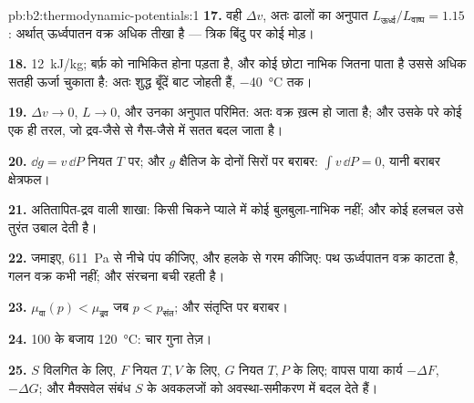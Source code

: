\begin{solution}{pb:b2:thermodynamic-potentials:1}
\textbf{17.} वही $\Delta v$, अतः ढालों का अनुपात $L_{\text{ऊर्ध्व}}/L_{\text{वाष्प}}
= 1.15$: अर्थात् ऊर्ध्वपातन वक्र अधिक तीखा है --- त्रिक बिंदु पर कोई मोड़।

\textbf{18.} \qty{12}{kJ/kg}; बर्फ़ को नाभिकित होना पड़ता है, और कोई छोटा नाभिक
जितना पाता है उससे अधिक सतही ऊर्जा चुकाता है: अतः शुद्ध बूँदें बाट जोहती हैं,
\qty{-40}{\celsius} तक।

\textbf{19.} $\Delta v \to 0$, $L \to 0$, और उनका अनुपात परिमित: अतः वक्र ख़त्म हो जाता है;
और उसके परे कोई एक ही तरल, जो द्रव-जैसे से गैस-जैसे में सतत बदल जाता है।

\textbf{20.} $\dd g = v\,\dd P$ नियत $T$ पर; और $g$ क्षैतिज के दोनों सिरों पर
बराबर: $\int v\,\dd P = 0$, यानी बराबर क्षेत्रफल।

\textbf{21.} अतितापित-द्रव वाली शाखा: किसी चिकने प्याले में कोई बुलबुला-नाभिक
नहीं; और कोई हलचल उसे तुरंत उबाल देती है।

\textbf{22.} जमाइए, \qty{611}{Pa} से नीचे पंप कीजिए, और हलके से गरम कीजिए: पथ
ऊर्ध्वपातन वक्र काटता है, गलन वक्र कभी नहीं; और संरचना
बची रहती है।

\textbf{23.} $\mu_{\text{वा}}(p) < \mu_{\text{द्रव}}$ जब $p < p_{\text{संत}}$; और
संतृप्ति पर बराबर।

\textbf{24.} \qty{100}{} के बजाय \qty{120}{\celsius}: चार गुना तेज़।

\textbf{25.} $S$ विलगित के लिए, $F$ नियत $T,V$ के लिए, $G$ नियत $T,P$ के लिए;
वापस पाया कार्य $-\Delta F$, $-\Delta G$; और मैक्सवेल संबंध $S$ के
अवकलजों को अवस्था-समीकरण में बदल देते हैं।
\end{solution}
